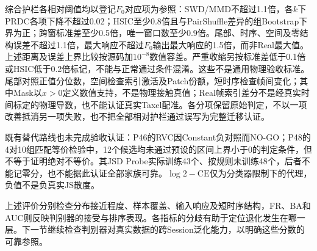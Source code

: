 综合护栏各相对阈值均以登记$F_0$对应项为参照：SWD/MMD不超过1.1倍，各$k$下PRDC各项下降不超过0.02；HSIC至少0.8倍且与PairShuffle差异的组Bootstrap下界为正；跨窗标准差至少0.5倍，唯一窗口数至少0.9倍。尾部、时序、空间及零结构误差不超过1.1倍，最大响应不超过$F_0$输出最大响应的1.5倍，而非Real最大值。上述距离及误差上界比较按源码加$10^{-8}$数值容差。严重收缩另按标准差低于0.1倍或HSIC低于0.2倍标记，不能与正常通过条件混淆。这些不是通用物理验收标准。尾部对照正值分位数，空间检查索引激活及Patch份额，短时序检查帧间变化；其中Mask以$x>0$定义数值支持，不是物理接触真值；Real帧索引差分不是经真实时间标定的物理导数，也不能认证真实Taxel配准。各分项保留原始判定，不以一项改善抵消另一项失败，也不把全部相对护栏通过误写为完整迁移认证。

既有替代路线也未完成验收认证：P46的RVC因Constant负对照而NO-GO；P48的4对10组匹配等价检验中，12个候选均未通过预设的区间上界小于0的判定条件，但不等于证明绝对不等价。其JSD Probe实际训练43个、按规则未训练48个，后者不能记零分，也不能据此认证全部家族可靠。$\log2-\mathrm{CE}$仅为分类器限制下的代理，负值不是负真实JS散度。

上述评价分别检查分布接近程度、样本覆盖、输入响应及短时序结构，FR、BA和AUC则反映判别器的接受与排序表现。各指标的分歧有助于定位退化发生在哪一层。下一节继续检查判别器对真实数据的跨Session泛化能力，以明确这些分数的可靠参照。
